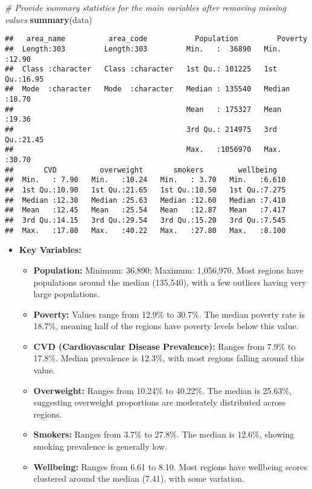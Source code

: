 \documentclass[
]{article}
\newenvironment{Shaded}{\begin{snugshade}}{\end{snugshade}}
\newcommand{\CommentTok}[1]{\textcolor[rgb]{0.56,0.35,0.01}{\textit{#1}}}
\newcommand{\FunctionTok}[1]{\textcolor[rgb]{0.13,0.29,0.53}{\textbf{#1}}}
\newcommand{\NormalTok}[1]{#1}
\begin{document}
\begin{Shaded}
\begin{Highlighting}[]
\CommentTok{\# Provide summary statistics for the main variables after removing missing values}
\FunctionTok{summary}\NormalTok{(data)}
\end{Highlighting}
\end{Shaded}

\begin{verbatim}
##   area_name          area_code           Population         Poverty     
##  Length:303         Length:303         Min.   :  36890   Min.   :12.90  
##  Class :character   Class :character   1st Qu.: 101225   1st Qu.:16.95  
##  Mode  :character   Mode  :character   Median : 135540   Median :18.70  
##                                        Mean   : 175327   Mean   :19.36  
##                                        3rd Qu.: 214975   3rd Qu.:21.45  
##                                        Max.   :1056970   Max.   :30.70  
##       CVD          overweight       smokers        wellbeing    
##  Min.   : 7.90   Min.   :10.24   Min.   : 3.70   Min.   :6.610  
##  1st Qu.:10.90   1st Qu.:21.65   1st Qu.:10.50   1st Qu.:7.275  
##  Median :12.30   Median :25.63   Median :12.60   Median :7.410  
##  Mean   :12.45   Mean   :25.54   Mean   :12.87   Mean   :7.417  
##  3rd Qu.:14.15   3rd Qu.:29.54   3rd Qu.:15.20   3rd Qu.:7.545  
##  Max.   :17.80   Max.   :40.22   Max.   :27.80   Max.   :8.100
\end{verbatim}

\begin{itemize}
\item
  \textbf{Key Variables:}

  \begin{itemize}
  \item
    \textbf{Population:} Minimum: 36,890; Maximum: 1,056,970. Most
    regions have populations around the median (135,540), with a few
    outliers having very large populations.
  \item
    \textbf{Poverty:} Values range from 12.9\% to 30.7\%. The median
    poverty rate is 18.7\%, meaning half of the regions have poverty
    levels below this value.
  \item
    \textbf{CVD (Cardiovascular Disease Prevalence):} Ranges from 7.9\%
    to 17.8\%. Median prevalence is 12.3\%, with most regions falling
    around this value.
  \item
    \textbf{Overweight:} Ranges from 10.24\% to 40.22\%. The median is
    25.63\%, suggesting overweight proportions are moderately
    distributed across regions.
  \item
    \textbf{Smokers:} Ranges from 3.7\% to 27.8\%. The median is 12.6\%,
    showing smoking prevalence is generally low.
  \item
    \textbf{Wellbeing:} Ranges from 6.61 to 8.10. Most regions have
    wellbeing scores clustered around the median (7.41), with some
    variation.
  \end{itemize}
\end{itemize}
\end{document}
